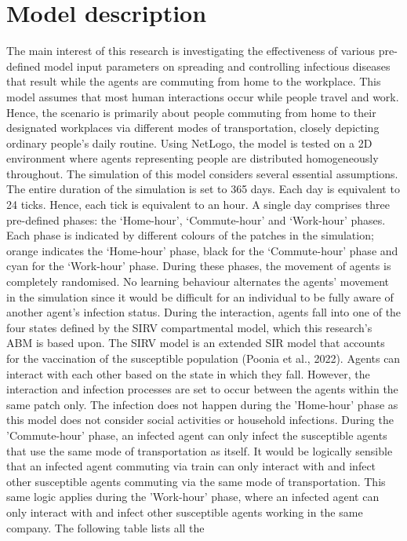 \documentclass[smallextended]{svjour3}       %
\begin{document}
\section{Model description}
The main interest of this research is investigating the effectiveness of various pre-defined model
input parameters on spreading and controlling infectious diseases that result while the agents
are commuting from home to the workplace. This model assumes that most human interactions
occur while people travel and work. Hence, the scenario is primarily about people commuting
from home to their designated workplaces via different modes of transportation, closely
depicting ordinary people's daily routine.
Using NetLogo, the model is tested on a 2D environment where agents representing people are
distributed homogeneously throughout. The simulation of this model considers several essential
assumptions. The entire duration of the simulation is set to 365 days. Each day is equivalent to
24 ticks. Hence, each tick is equivalent to an hour. A single day comprises three pre-defined
phases: the ‘Home-hour’, ‘Commute-hour’ and ‘Work-hour’ phases. Each phase is indicated by
different colours of the patches in the simulation; orange indicates the ‘Home-hour’ phase, black
for the ‘Commute-hour’ phase and cyan for the ‘Work-hour’ phase.
During these phases, the movement of agents is completely randomised. No learning behaviour
alternates the agents’ movement in the simulation since it would be difficult for an individual to
be fully aware of another agent’s infection status. During the interaction, agents fall into one of
the four states defined by the SIRV compartmental model, which this research’s ABM is based
upon. The SIRV model is an extended SIR model that accounts for the vaccination of the
susceptible population (Poonia et al., 2022).
Agents can interact with each other based on the state in which they fall. However, the
interaction and infection processes are set to occur between the agents within the same patch
only. The infection does not happen during the 'Home-hour' phase as this model does not
consider social activities or household infections. During the 'Commute-hour' phase, an infected
agent can only infect the susceptible agents that use the same mode of transportation as itself.
It would be logically sensible that an infected agent commuting via train can only interact with and infect other susceptible agents commuting via the same mode of transportation. This same
logic applies during the 'Work-hour' phase, where an infected agent can only interact with and
infect other susceptible agents working in the same company. The following table lists all the
\end{document}
